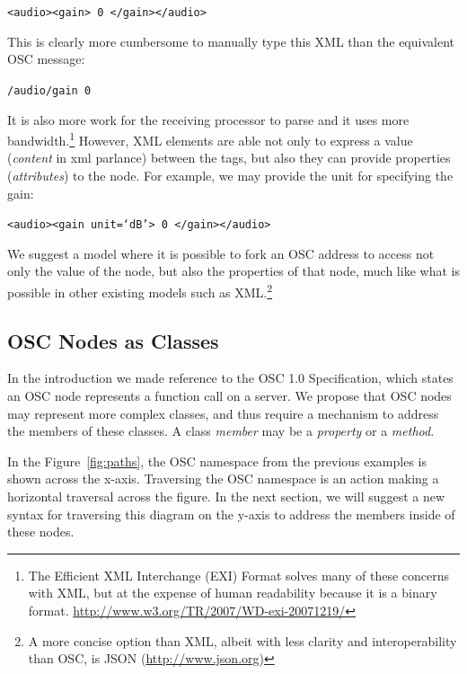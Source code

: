 \documentclass{NIME-alternate}
\begin{document}
\texttt{<audio><gain> 0 </gain></audio>}

This is clearly more cumbersome to manually type this XML than the equivalent OSC message:

\texttt{/audio/gain 0}

It is also more work for the receiving processor to parse and it uses more bandwidth.\footnote{The Efficient XML Interchange (EXI) Format solves many of these concerns with XML, but at the expense of human readability because it is a binary format.  \url{http://www.w3.org/TR/2007/WD-exi-20071219/}} However, XML elements are able not only to express a value (\emph{content} in xml parlance) between the tags, but also they can provide properties (\emph{attributes}) to the node. For example, we may provide the unit for specifying the gain:

\texttt{<audio><gain unit=`dB'> 0 </gain></audio>}

We suggest a model where it is possible to fork an OSC address to access not only the value of the node, but also the properties of that node, much like what is possible in other existing models such as XML.\footnote{A more concise option than XML, albeit with less clarity and interoperability than OSC, is JSON (\url{http://www.json.org})}



\subsection{OSC Nodes as Classes} %
\label{sub:osc_nodes_as_classes}

In the introduction we made reference to the OSC 1.0 Specification, which states an OSC node represents a function call on a server. We propose that OSC nodes may represent more complex classes, and thus require a mechanism to address the members of these classes. A class \emph{member} may be a \emph{property} or a \emph{method}.

In the Figure~\ref{fig:paths}, the OSC namespace from the previous examples is shown across the x-axis. Traversing the OSC namespace is an action making a horizontal traversal across the figure.  In the next section, we will suggest a new syntax for traversing this diagram on the y-axis to address the members inside of these nodes.
\end{document}
